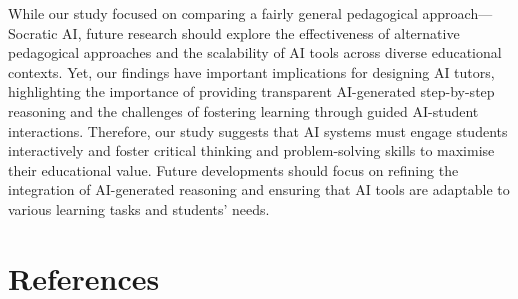 \documentclass[
  11pt,
]{article}
\begin{document}
While our study focused on comparing a fairly general pedagogical approach---Socratic AI, future research should explore the effectiveness of alternative pedagogical approaches and the scalability of AI tools across diverse educational contexts. Yet, our findings have important implications for designing AI tutors, highlighting the importance of providing transparent AI-generated step-by-step reasoning and the challenges of fostering learning through guided AI-student interactions. Therefore, our study suggests that AI systems must engage students interactively and foster critical thinking and problem-solving skills to maximise their educational value. Future developments should focus on refining the integration of AI-generated reasoning and ensuring that AI tools are adaptable to various learning tasks and students' needs.

\section*{References}\label{references}
\end{document}
